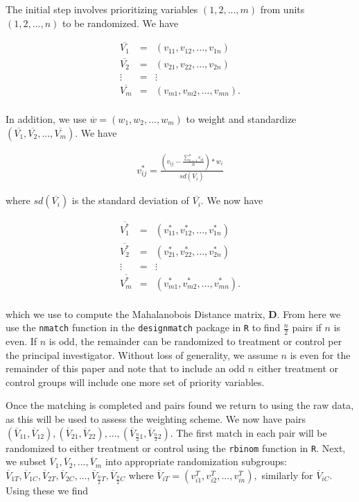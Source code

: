 \documentclass[]{sagej}
\begin{document}
The initial step involves prioritizing variables \((1, 2,..., m)\) from
units \((1, 2, ..., n)\) to be randomized. We have

\begin{eqnarray*}
 \overline{V_1} & = & (v_{11}, v_{12},..., v_{1n})\\
 \overline{V_2} & = & (v_{21}, v_{22},..., v_{2n})\\
 \vdots & = & \vdots\\    
 \overline{V_m} & = & (v_{m1}, v_{m2},..., v_{mn}).\\
 \end{eqnarray*}

In addition, we use \(\overline{w} = (w_{1}, w_{2},..., w_{m})\) to
weight and standardize
\((\overline{V_1}, \overline{V_2}, ..., \overline{V_m}).\) We have

\begin{eqnarray*}
v^{*}_{ij} = \frac{(v_{ij} - \frac{\sum _{k=1}^{n}v_{ik}}{n})*w_i}{sd(\overline{V_i})} 
 \end{eqnarray*}

where \(sd(\overline{V_i})\) is the standard deviation of
\(\overline{V_i}.\) We now have

\begin{eqnarray*}
 \overline{V_1^*} & = & (v_{11}^*, v_{12}^*,..., v_{1n}^*)\\
 \overline{V_2^*} & = & (v_{21}^*, v_{22}^*,..., v_{2n}^*)\\
 \vdots & = & \vdots\\    
 \overline{V_m^*} & = & (v_{m1}^*, v_{m2}^*,..., v_{mn}^*).\\
 \end{eqnarray*}

which we use to compute the Mahalanobois Distance matrix, \textbf{D}.
From here we use the \texttt{nmatch} function in the
\texttt{designmatch} \citep{doi} package in \texttt{R} \citep{nmatch}to
find \(\frac{n}{2}\) pairs if \(n\) is even. If \(n\) is odd, the
remainder can be randomized to treatment or control per the principal
investigator. Without loss of generality, we assume \(n\) is even for
the remainder of this paper and note that to include an odd \(n\) either
treatment or control groups will include one more set of priority
variables.

Once the matching is completed and pairs found we return to using the
raw data, as this will be used to assess the weighting scheme. We now
have pairs
\((\overline{V}_{11}, \overline{V}_{12}), (\overline{V}_{21}, \overline{V}_{22}), ..., (\overline{V}_{\frac{n}{2}1}, \overline{V}_{\frac{n}{2}2}).\)
The first match in each pair will be randomized to either treatment or
control using the \texttt{rbinom} function in \texttt{R}. Next, we
subset \(\overline{V}_1, \overline{V}_2, ..., \overline{V}_m\) into
appropriate randomization subgroups:
\(\overline{V}_{1T}, \overline{V}_{1C}, \overline{V}_{2T}, \overline{V}_{2C},..., \overline{V}_{\frac{n}{2}T}, \overline{V}_{\frac{n}{2}C}\)
where \(\overline{V}_{iT} = (v_{i1}^T, v_{i2}^T,..., v_{in}^T),\)
similarly for \(\overline{V}_{iC}.\) Using these we find
\end{document}
